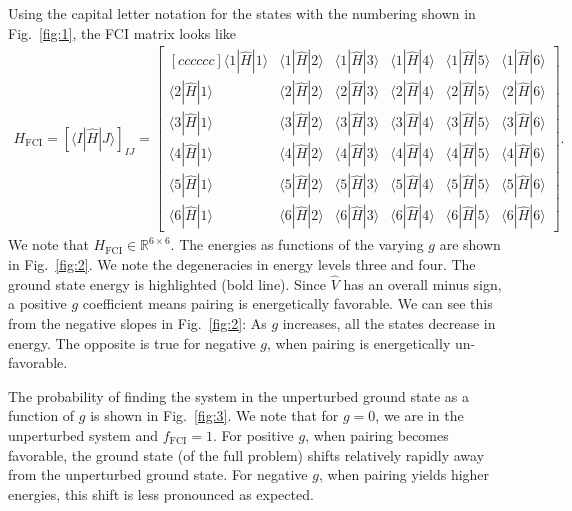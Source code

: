 \documentclass[a4paper]{article}
\newcommand{\bmat}[2]{\begin{bmatrix}[#1] #2 \end{bmatrix}}  %
\newcommand{\R}{\mathbb{R}}
\newcommand{\fig}[1]{Fig.\ \ref{fig:#1}}
\begin{document}
Using the capital letter notation for the states with the numbering shown in \fig{1}, the FCI matrix looks like
\begin{align}
H_\text{FCI} = \left[ \langle I |\hat H|J\rangle \right]_{IJ} =  \bmat{cccccc}{\langle 1|\hat H |1\rangle & \langle 1|\hat H |2\rangle & \langle 1|\hat H |3\rangle & \langle 1|\hat H |4\rangle & \langle 1|\hat H |5\rangle & \langle 1|\hat H |6\rangle \\
\langle 2|\hat H |1\rangle & \langle 2|\hat H |2\rangle & \langle 2|\hat H |3\rangle & \langle 2|\hat H |4\rangle & \langle 2|\hat H |5\rangle & \langle 2|\hat H |6\rangle \\
\langle 3|\hat H |1\rangle & \langle 3|\hat H |2\rangle & \langle 3|\hat H |3\rangle & \langle 3|\hat H |4\rangle & \langle 3|\hat H |5\rangle & \langle 3|\hat H |6\rangle \\
\langle 4|\hat H |1\rangle & \langle 4|\hat H |2\rangle & \langle 4|\hat H |3\rangle & \langle 4|\hat H |4\rangle & \langle 4|\hat H |5\rangle & \langle 4|\hat H |6\rangle \\
\langle 5|\hat H |1\rangle & \langle 5|\hat H |2\rangle & \langle 5|\hat H |3\rangle & \langle 5|\hat H |4\rangle & \langle 5|\hat H |5\rangle & \langle 5|\hat H |6\rangle \\
\langle 6|\hat H |1\rangle & \langle 6|\hat H |2\rangle & \langle 6|\hat H |3\rangle & \langle 6|\hat H |4\rangle & \langle 6|\hat H |5\rangle & \langle 6|\hat H |6\rangle}.
\end{align}
We note that $H_\text{FCI}\in \R^{6\times6}$. The energies as functions of the varying $g$ are shown in \fig{2}. We note the degeneracies in energy levels three and four. The ground state energy is highlighted (bold line). Since $\hat V$ has an overall minus sign, a positive $g$ coefficient means pairing is energetically favorable. We can see this from the negative slopes in \fig{2}: As $g$ increases, all the states decrease in energy. The opposite is true for negative $g$, when pairing is energetically un-favorable.

The probability of finding the system in the unperturbed ground state as a function of $g$ is shown in \fig{3}. We note that for $g=0$, we are in the unperturbed system and $f_\text{FCI}=1$. For positive $g$, when pairing becomes favorable, the ground state (of the full problem) shifts relatively rapidly away from the unperturbed ground state. For negative $g$, when pairing yields higher energies, this shift is less pronounced as expected. 
\end{document}
